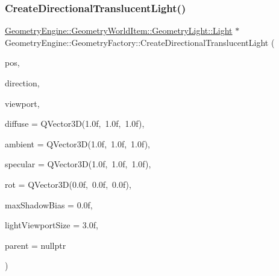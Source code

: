\subsubsection{\texorpdfstring{CreateDirectionalTranslucentLight()}{CreateDirectionalTranslucentLight()}\hspace{0.1cm}{\footnotesize\ttfamily [1/2]}}
{\footnotesize\ttfamily \mbox{\hyperlink{class_geometry_engine_1_1_geometry_world_item_1_1_geometry_light_1_1_light}{Geometry\+Engine\+::\+Geometry\+World\+Item\+::\+Geometry\+Light\+::\+Light}} $\ast$ Geometry\+Engine\+::\+Geometry\+Factory\+::\+Create\+Directional\+Translucent\+Light (\begin{DoxyParamCaption}\item[{const Q\+Vector3D \&}]{pos,  }\item[{const Q\+Vector3D \&}]{direction,  }\item[{const \mbox{\hyperlink{class_geometry_engine_1_1_geometry_item_utils_1_1_viewport}{Geometry\+Item\+Utils\+::\+Viewport}} \&}]{viewport,  }\item[{const Q\+Vector3D \&}]{diffuse = {\ttfamily QVector3D(1.0f,~1.0f,~1.0f)},  }\item[{const Q\+Vector3D \&}]{ambient = {\ttfamily QVector3D(1.0f,~1.0f,~1.0f)},  }\item[{const Q\+Vector3D \&}]{specular = {\ttfamily QVector3D(1.0f,~1.0f,~1.0f)},  }\item[{const Q\+Vector3D \&}]{rot = {\ttfamily QVector3D(0.0f,~0.0f,~0.0f)},  }\item[{float}]{max\+Shadow\+Bias = {\ttfamily 0.0f},  }\item[{float}]{light\+Viewport\+Size = {\ttfamily 3.0f},  }\item[{\mbox{\hyperlink{class_geometry_engine_1_1_geometry_world_item_1_1_world_item}{Geometry\+World\+Item\+::\+World\+Item}} $\ast$}]{parent = {\ttfamily nullptr} }\end{DoxyParamCaption})\hspace{0.3cm}{\ttfamily [static]}}

